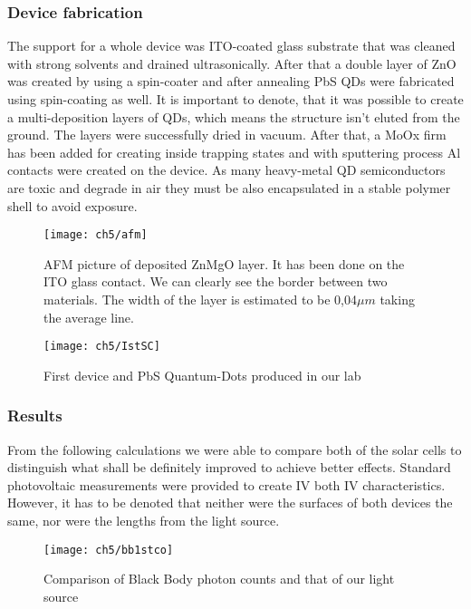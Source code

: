 \subsubsection{Device fabrication}
The support for a whole device was ITO-coated glass substrate that was cleaned with strong solvents and drained ultrasonically. After that a double layer of ZnO was created by using a spin-coater and after annealing PbS QDs were fabricated using spin-coating as well. It is important to denote, that it was possible to create a multi-deposition layers of QDs, which means the structure isn’t eluted from the ground. The layers were successfully dried in vacuum. After that, a MoOx firm has been added for creating inside trapping states and with sputtering process Al contacts were created on the device. As many heavy-metal QD semiconductors are toxic and degrade in air they must be also encapsulated in a stable polymer shell to avoid exposure. 

\begin{figure}[H]
\center
\texttt{[image: ch5/afm]}
\caption{AFM picture of deposited ZnMgO layer. It has been done on the ITO glass contact. We can clearly see the border between two materials. The width of the layer is estimated to be 0,04$\mu m$ taking the average line.}
\end{figure}

\begin{figure}
\center
\texttt{[image: ch5/IstSC]}
\caption{First device and PbS Quantum-Dots produced in our lab}
\end{figure}

\newpage
\subsubsection{Results}

From the following calculations we were able to compare both of the solar cells to distinguish what shall be definitely improved to achieve better effects. Standard photovoltaic measurements were provided to create IV both IV characteristics. However, it has to be denoted that neither were the surfaces of both devices the same, nor were the lengths from the light source. 

\begin{figure}[H]
\center
\texttt{[image: ch5/bb1stco]}
\caption{Comparison of Black Body photon counts and that of our light source}
\end{figure}

